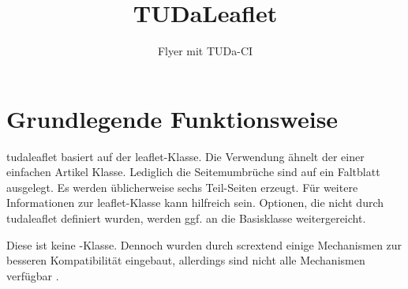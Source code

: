 \documentclass[
	german,%
	accentcolor=9c,%
]{tudaleaflet}
\newcommand*{\pkg}[1]{\textsf{#1}}
\newcommand*{\cls}[1]{\textsf{#1}}
\begin{document}
\title{TUDaLeaflet}
\subtitle{Flyer mit TUDa-CI}


\maketitle

\section{Grundlegende Funktionsweise}
\cls{tudaleaflet} basiert auf der \cls{leaflet}-Klasse.
Die Verwendung ähnelt der einer einfachen Artikel Klasse. Lediglich die Seitemumbrüche sind auf ein Faltblatt ausgelegt. Es werden üblicherweise sechs Teil-Seiten erzeugt.
Für weitere Informationen zur \cls{leaflet}-Klasse kann \cite{leaflet} hilfreich sein.
Optionen, die nicht durch \cls{tudaleaflet} definiert wurden, werden ggf. an die Basisklasse weitergereicht.

Diese ist keine \KOMAScript-Klasse. Dennoch wurden durch \pkg{scrextend} einige Mechanismen zur besseren Kompatibilität eingebaut, allerdings sind nicht alle Mechanismen verfügbar \cite[vgl.][]{scrguide}.
\end{document}
